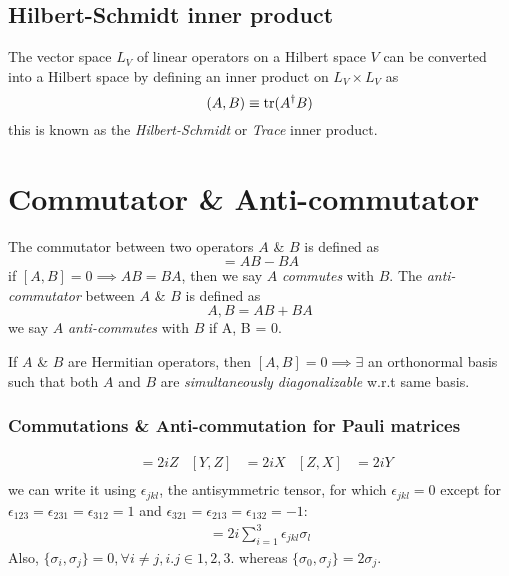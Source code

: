 \subsection{Hilbert-Schmidt inner product}
The vector space $L_V$ of linear operators on a Hilbert space $V$ can be converted into a Hilbert space by defining an inner product on $L_V \times L_V$ as
\begin{equation}
    (A, B) \equiv \text{tr}(A^\dag B)
\end{equation}
this is known as the \textit{Hilbert-Schmidt} or \textit{Trace} inner product.

\section{Commutator \& Anti-commutator}

The commutator between two operators $A$ \& $B$ is defined as
\begin{equation}
    [A, B] = AB - BA
\end{equation}
if $[A, B] = 0 \implies AB = BA$, then we say $A$ \textit{commutes} with $B$. The \textit{anti-commutator} between $A$ \& $B$ is defined as
\begin{equation}
    {A, B} = AB + BA
\end{equation}
we say $A$ \textit{anti-commutes} with $B$ if {A, B} = 0.

\begin{theorem}
    If $A$ \& $B$ are Hermitian operators, then
    $[A, B] = 0 \implies \exists$ an orthonormal basis such that both $A$ and $B$ are \textit{simultaneously diagonalizable} w.r.t same basis.
\end{theorem}

\subsubsection{Commutations \& Anti-commutation for Pauli matrices}
\begin{align}
    [X, Y] &= 2iZ & [Y,Z] &= 2iX & [Z,X] &= 2iY \\
\end{align}
we can write it using $\epsilon_{jkl}$, the antisymmetric tensor, for which $\epsilon_{jkl} = 0$ except for $\epsilon_{123} = \epsilon_{231} = \epsilon_{312} = 1$ and $\epsilon_{321} = \epsilon_{213} = \epsilon_{132} = -1$:
\begin{align}
    [\sigma_j, \sigma_k] = 2i\sum_{i=1}^3 \epsilon_{jkl}\sigma_l
\end{align}
Also, $\{\sigma_i, \sigma_j\} = 0, \forall i\neq j, i.j \in {1,2,3}$. whereas $\{\sigma_0, \sigma_j\} = 2\sigma_j$. 

